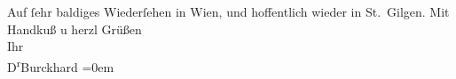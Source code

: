 \pstart
           Auf{ }ſehr baldiges Wiederſehen in Wien, und
               hoffentlich wieder in St. Gilgen. Mit Handkuß u
               herzl Grüßen{\\[\baselineskip]}Ihr{\\[\baselineskip]}\spacefill\mbox{D\textsuperscript{r}Burckhard}\pend
           \leftskip=0em{}\endnumbering{}  \newcommand{\dateiname}{L01922}\newcommand{\titel}{Max Burckhard an Arthur Schnitzler, 8. 4. 1910}\newcommand{\editorInnen}{Martin Anton Müller und Gerd-Hermann Susen}
